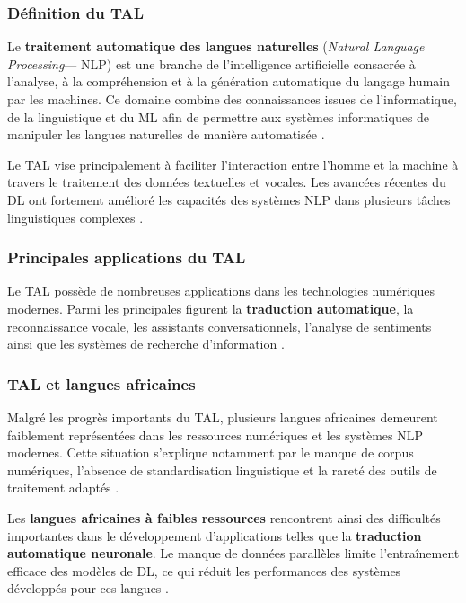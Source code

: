 \subsubsection{Définition du \ac{TAL}}

Le \textbf{traitement automatique des langues naturelles} (\textit{Natural Language Processing}--- \ac{NLP}) est une branche de l'intelligence artificielle consacrée à l'analyse, à la compréhension et à la génération automatique du langage humain par les machines. Ce domaine combine des connaissances issues de l'informatique, de la linguistique et du \ac{ML} afin de permettre aux systèmes informatiques de manipuler les langues naturelles de manière automatisée \cite{ranathunga2023neural}.

Le \ac{TAL} vise principalement à faciliter l'interaction entre l'homme et la machine à travers le traitement des données textuelles et vocales. Les avancées récentes du \ac{DL} ont fortement amélioré les capacités des systèmes \ac{NLP} dans plusieurs tâches linguistiques complexes \cite{vaswani2017attention}.

\subsubsection{Principales applications du \ac{TAL}}

Le \ac{TAL} possède de nombreuses applications dans les technologies numériques modernes. Parmi les principales figurent la \textbf{traduction automatique}, la reconnaissance vocale, les assistants conversationnels, l'analyse de sentiments ainsi que les systèmes de recherche d'information \cite{ranathunga2023neural}.

\subsubsection{\ac{TAL} et langues africaines}

Malgré les progrès importants du \ac{TAL}, plusieurs langues africaines demeurent faiblement représentées dans les ressources numériques et les systèmes \ac{NLP} modernes. Cette situation s'explique notamment par le manque de corpus numériques, l'absence de standardisation linguistique et la rareté des outils de traitement adaptés \cite{agyei2024low}.

Les \textbf{langues africaines à faibles ressources} rencontrent ainsi des difficultés importantes dans le développement d'applications telles que la \textbf{traduction automatique neuronale}. Le manque de données parallèles limite l'entraînement efficace des modèles de \ac{DL}, ce qui réduit les performances des systèmes développés pour ces langues \cite{mandiya2026lingala}.

